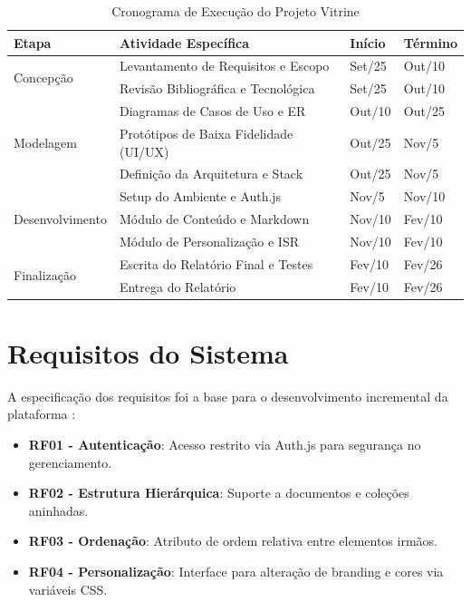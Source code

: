 \begin{table}[h!]
\centering
\caption{Cronograma de Execução do Projeto Vitrine}
\label{tab:cronograma}
\renewcommand{\arraystretch}{1.3}
\begin{tabular}{@{}p{3.5cm} p{5.5cm} p{2.5cm} p{2.5cm}@{}}
\toprule
\textbf{Etapa} & \textbf{Atividade Específica} & \textbf{Início} & \textbf{Término} \\
\midrule
\multirow{2}{*}{Concepção}
& Levantamento de Requisitos e Escopo & Set/25 & Out/10 \\
& Revisão Bibliográfica e Tecnológica & Set/25 & Out/10 \\
\midrule
\multirow{3}{*}{Modelagem}
& Diagramas de Casos de Uso e ER & Out/10 & Out/25 \\
& Protótipos de Baixa Fidelidade (UI/UX) & Out/25 & Nov/5 \\
& Definição da Arquitetura e Stack & Out/25 & Nov/5 \\
\midrule
\multirow{3}{*}{Desenvolvimento}
& Setup do Ambiente e Auth.js & Nov/5 & Nov/10 \\
& Módulo de Conteúdo e Markdown & Nov/10 & Fev/10 \\
& Módulo de Personalização e ISR & Nov/10 & Fev/10 \\
\midrule
\multirow{2}{*}{Finalização}
& Escrita do Relatório Final e Testes & Fev/10 & Fev/26 \\
& Entrega do Relatório & Fev/10 & Fev/26 \\
\bottomrule
\end{tabular}
\end{table}

\section{Requisitos do Sistema}

A especificação dos requisitos foi a base para o desenvolvimento incremental da plataforma \cite{Sommerville2011}:

\begin{itemize}
    \item \textbf{RF01 - Autenticação}: Acesso restrito via Auth.js para segurança no gerenciamento.
    \item \textbf{RF02 - Estrutura Hierárquica}: Suporte a documentos e coleções aninhadas.
    \item \textbf{RF03 - Ordenação}: Atributo de ordem relativa entre elementos irmãos.
    \item \textbf{RF04 - Personalização}: Interface para alteração de branding e cores via variáveis CSS.
\end{itemize}

